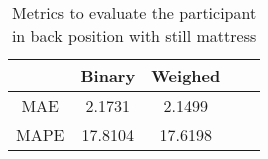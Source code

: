 \begin{table}[H]
    \centering
    \begin{tabular}{|c|c|c|c|c|}
    \hline 
    & Binary  & Weighed  \\ 
    \hline 
    MAE  &   2.1731  &  2.1499 \\ 
    MAPE  & 17.8104  & 17.6198 \\ 
    \hline 
    \end{tabular}
    
    \caption{Metrics to evaluate the participant in back position with still mattress}
    \end{table}
    
    